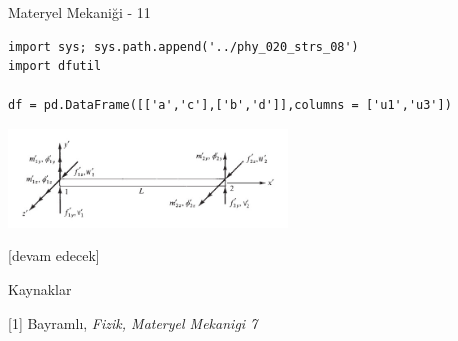 \documentclass[12pt,fleqn]{article}\usepackage{../../common}
\begin{document}
Materyel Mekaniği - 11

\begin{verbatim}
import sys; sys.path.append('../phy_020_strs_08')
import dfutil

df = pd.DataFrame([['a','c'],['b','d']],columns = ['u1','u3'])
\end{verbatim}






\includegraphics[width=20em]{phy_020_strs_11_01.jpg}
















[devam edecek]

Kaynaklar

[1] Bayramlı, {\em Fizik, Materyel Mekanigi 7}
\end{document}
